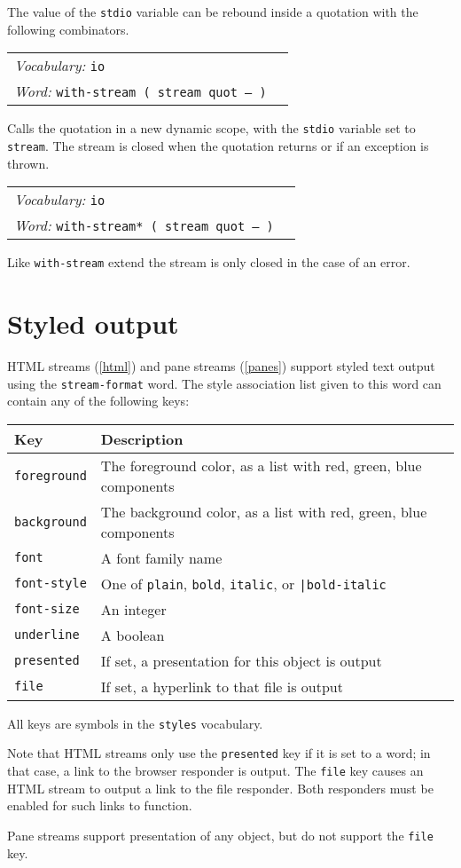 \documentclass{book}
\newcommand{\ttindex}[1]{\texttt{#1}\index{\texttt{#1}}}
\newcommand{\vocabulary}[1]{\emph{Vocabulary:} \texttt{#1}&\\}
\newcommand{\ordinaryword}[2]{\index{\texttt{#1}}\emph{Word:} \texttt{#2}&\\}
\newcommand{\wordtable}[1]{


\begin{tabularx}{12cm}{lX}
\hline
#1
\hline
\end{tabularx}

}
\begin{document}
The value of the \texttt{stdio} variable can be rebound inside a quotation with the following combinators.

\wordtable{
\vocabulary{io}
\ordinaryword{with-stream}{with-stream ( stream quot -- )}
}
Calls the quotation in a new dynamic scope, with the \texttt{stdio} variable set to \texttt{stream}. The stream is closed when the quotation returns or if an exception
is thrown.
\wordtable{
\vocabulary{io}
\ordinaryword{with-stream*}{with-stream* ( stream quot -- )}
}
Like \verb|with-stream| extend the stream is only closed in the case of an error.

\section{Styled output}\label{styles}

HTML streams (\ref{html}) and pane streams (\ref{panes}) support styled text output using the \verb|stream-format| word. The style association list given to this word can contain any of the following keys:

\begin{tabular}{l|l}
Key&Description\\
\hline
\ttindex{foreground}&The foreground color, as a list with red, green, blue components\\
\ttindex{background}&The background color, as a list with red, green, blue components\\
\ttindex{font}&A font family name\\
\ttindex{font-style}&One of \ttindex{plain}, \ttindex{bold}, \ttindex{italic}, or \ttindex{|bold-italic}\\
\ttindex{font-size}&An integer\\
\ttindex{underline}&A boolean\\
\ttindex{presented}&If set, a presentation for this object is output\\
\ttindex{file}&If set, a hyperlink to that file is output\\
\end{tabular}

All keys are symbols in the \verb|styles| vocabulary.

Note that
HTML streams only use the \verb|presented| key if it is set to a word; in that case, a link to the browser responder is output. The \verb|file| key causes an HTML stream to output a link to the file responder. Both responders must be enabled for such links to function.

Pane streams support presentation of any object, but do not support the \verb|file| key.
\end{document}
